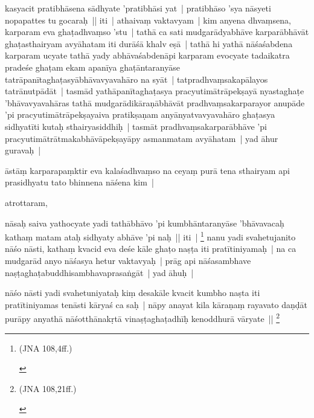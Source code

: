\documentclass[article,a4paper]{memoir}
\begin{document}
	  \pstart kasyacit pratibhā\-sena sā\-dhyate 'pratibhā\-si yat | pratibhā\-so 'sya nā\-syeti nopapattes tu gocaraḥ || iti | \label{thakur75-119.1} athaivaṃ vaktavyam | kim anyena dhvaṃsena, karparam eva ghaṭadhvaṃso 'stu | tathā\- ca sati mudgarā\-dyabhā\-ve karparā\-bhā\-vā\-t ghaṭasthairyam avyā\-hatam iti \label{thakur75-119.2} durā\-śā\- khalv eṣā\- | tathā\- hi yathā\- nā\-śaśabdena karparam ucyate tathā\- yady abhā\-vaśabdenā\-pi karparam evocyate tadaikatra pradeśe ghaṭam ekam apanī\-ya ghaṭā\-ntaranyā\-se tatrā\-panī\-taghaṭasyā\-bhā\-vavyavahā\-ro na syā\-t | tatpradhvaṃsakapā\-layos tatrā\-nutpā\-dā\-t | tasmā\-d yathā\-panī\-taghaṭasya pracyutimā\-trā\-pekṣayā\- nyastaghaṭe 'bhā\-vavyavahā\-ras tathā\- mudgarā\-dikā\-raṇā\-bhā\-vā\-t pradhvaṃsakarparayor anupā\-de 'pi pracyutimā\-trā\-pekṣayaiva pratikṣaṇam anyā\-nyatvavyavahā\-ro ghaṭasya sidhyatī\-ti kutaḥ sthairyasiddhiḥ | tasmā\-t pradhvaṃsakarparā\-bhā\-ve 'pi pracyutimā\-trā\-tmakabhā\-vā\-pekṣayā\-py asmanmatam avyā\-hatam | \label{thakur75-119.9} yad ā\-hur guravaḥ |
	\pend
      

	  \pstart ā\-stā\-ṃ karparapaṃktir eva kalaśadhvaṃso na ceyaṃ purā\- tena sthairyam api prasidhyatu tato bhinnena nā\-śena kim |
	\pend
      

	  \pstart atrottaram,
	\pend
      

	  \pstart nā\-saḥ saiva yathocyate yadi tathā\-bhā\-vo 'pi kumbhā\-ntaranyā\-se 'bhā\-vavacaḥ kathaṃ matam ataḥ sidhyaty abhā\-ve 'pi naḥ || iti | \footnote{\begin{english}(JNA 108,4ff.)\end{english}} \label{thakur75-119.16} nanu yadi svahetujanito nā\-śo nā\-sti, kathaṃ kvacid eva deśe kā\-le ghaṭo naṣṭa iti pratī\-tiniyamaḥ | na ca mudgarā\-d anyo nā\-śasya hetur vaktavyaḥ | prā\-g api nā\-śasambhave naṣṭaghaṭabuddhisambhavaprasaṅgā\-t | yad ā\-huḥ |
	\pend
      

	  \pstart nā\-śo nā\-sti yadi svahetuniyataḥ kiṃ desakā\-le kvacit kumbho naṣta iti pratī\-tiniyamas tenā\-sti kā\-ryaś ca saḥ | nā\-py anayat kila kā\-raṇaṃ rayavato daṇḍā\-t purā\-py anyathā\- nā\-śotthā\-nakṛtā\- vinaṣṭaghaṭadhī\-ḥ kenoddhurā\- vā\-ryate || \footnote{\begin{english}(JNA 108,21ff.)\end{english}}
	\pend
      
\end{document}
